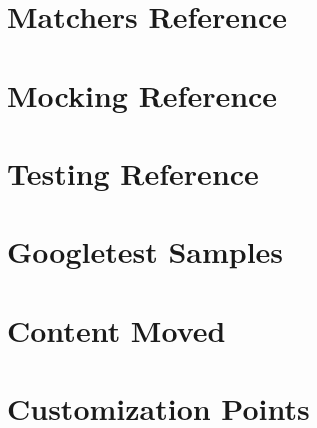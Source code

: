\documentclass[twoside]{book}
\newcommand{\+}{\discretionary{\mbox{\scriptsize$\hookleftarrow$}}{}{}}
\begin{document}
\chapter{Matchers Reference}
\label{md___users_peterjanku__sources_cpp__kilobot_arena_external_googletest_docs_reference_matchers}

\chapter{Mocking Reference}
\label{md___users_peterjanku__sources_cpp__kilobot_arena_external_googletest_docs_reference_mocking}

\chapter{Testing Reference}
\label{md___users_peterjanku__sources_cpp__kilobot_arena_external_googletest_docs_reference_testing}

\chapter{Googletest Samples}
\label{md___users_peterjanku__sources_cpp__kilobot_arena_external_googletest_docs_samples}

\chapter{Content Moved}
\label{md___users_peterjanku__sources_cpp__kilobot_arena_external_googletest_googlemock_docs__r_e_a_d_m_e}

\chapter{Customization Points}
\label{md___users_peterjanku__sources_cpp__kilobot_arena_external_googletest_googlemock_include_gmock_internal_custom__r_e_a_d_m_e}

\end{document}
